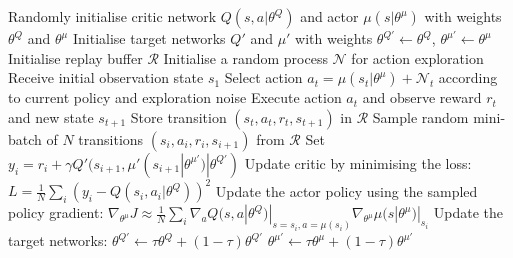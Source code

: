 \begin{algorithmic}
\State Randomly initialise critic network $Q(s, a|\theta^Q)$ and actor $\mu(s|\theta^\mu)$ with weights $\theta^Q$ and $\theta^\mu$
\State Initialise target networks $Q'$ and $\mu'$ with weights $\theta^{Q'} \leftarrow \theta^Q$, $\theta^{\mu'} \leftarrow \theta^\mu$
\State Initialise replay buffer $\mathcal{R}$
    \State Initialise a random process $\mathcal{N}$ for action exploration
    \State Receive initial observation state $s_1$
        \State Select action $a_t = \mu(s_t|\theta^\mu) + \mathcal{N}_t$ according to current policy and exploration noise
        \State Execute action $a_t$ and observe reward $r_t$ and new state $s_{t+1}$
        \State Store transition $(s_t, a_t, r_t, s_{t+1})$ in $\mathcal{R}$
        \State Sample random mini-batch of $N$ transitions $(s_i, a_i, r_i, s_{i+1})$ from $\mathcal{R}$
        \State Set $y_i = r_i + \gamma Q'(s_{i+1}, \mu'(s_{i+1}|\theta^{\mu'})|\theta^{Q'})$
        \State Update critic by minimising the loss: $L = \frac{1}{N}\sum_i (y_i - Q(s_i, a_i|\theta^Q))^2$
        \State Update the actor policy using the sampled policy gradient:
        \State \quad $\nabla_{\theta^\mu} J \approx \frac{1}{N}\sum_i \nabla_a Q(s, a|\theta^Q)|_{s=s_i,a=\mu(s_i)} \nabla_{\theta^\mu}\mu(s|\theta^\mu)|_{s_i}$
        \State Update the target networks:
        \State \quad $\theta^{Q'} \leftarrow \tau \theta^Q + (1 - \tau)\theta^{Q'}$
        \State \quad $\theta^{\mu'} \leftarrow \tau \theta^\mu + (1 - \tau)\theta^{\mu'}$
    \EndFor
\EndFor
\end{algorithmic}